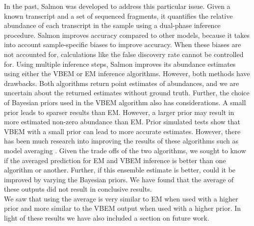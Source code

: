 In the past, Salmon was developed to address this particular issue. Given a known transcript and a set of sequenced fragments, 
it quantifies the relative abundance of each transcript in the sample using a dual-phase inference procedure. 
Salmon improves accuracy compared to other models, because it takes into account sample-specific biases to improve accuracy. 
When these biases are not accounted for, calculations like the false discovery rate cannot be controlled for. 
Using multiple inference steps, Salmon improves its abundance estimates using either the VBEM or EM inference algorithms. 
However, both methods have drawbacks. Both algorithms return point estimates of abundances, and we are uncertain about the returned 
estimates without ground truth. Further, the choice of  Bayesian priors used in the VBEM algorithm also has considerations. 
A small prior leads to sparser results than EM. However, a larger prior may result in more estimated non-zero abundance than EM. 
Prior simulated tests \cite{noauthor_salmon_nodate} show that VBEM with a small prior can lead to more accurate estimates. However, 
there has been much research into improving the results of these algorithms such as model averaging \cite{hoeting_bayesian_1999}. 
Given the trade offs of the two algorithms, we sought to know if the averaged prediction for EM and VBEM inference is better than 
one algorithm or another. Further, if this ensemble estimate is better, could it be improved by varying the Bayesian priors.
We have found that the average of these outputs did not result in conclusive results. \\

We saw that using the average is very similar to EM when used with a higher prior and more similar to the VBEM output when used with 
a higher prior. In light of these results we have also included a section on future work. 
